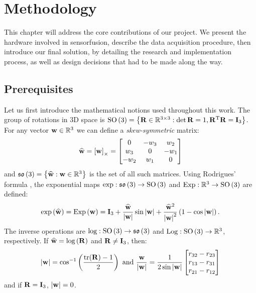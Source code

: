\chapter{Methodology}
\label{ch:methodology}

This chapter will address the core contributions of our project.
We present the hardware involved in \gls{sensorfusion}, describe the data acquisition procedure, then introduce our final solution, by detailing the research and implementation process, as well as design decisions that had to be made along the way.

\section{Prerequisites}

\newcommand{\wvec}{\vecx{w}}
\newcommand{\what}{\widehat{\vecx{w}}}
\newcommand{\wmod}{\left|\vecx{w}\right|}
\newcommand{\xihat}{\widehat{\xi}}

Let us first introduce the mathematical notions used throughout this work. The group of rotations in 3D space is $\operatorname{SO}\left(3\right) = \left\{\mathbf{R} \in {\mathbb{R}}^{3\times3} : \det{\mathbf{R}} = 1, {\mathbf{R}}^\text{T}\mathbf{R} = \mathbf{I}_3 \right\}$. For any vector $\wvec \in \RR^3$ we can define a \emph{skew-symmetric} matrix:
\begin{equation}
	\what  = \skewsym{\wvec} =
	\begin{bmatrix}
		0    & -w_3 & w_2  \\
		w_3  & 0    & -w_1 \\
		-w_2 & w_1  & 0
	\end{bmatrix}
\end{equation}
and $\so{3} = \left\{\what : \vecx{w} \in \RR^3 \right\}$ is the set of all such matrices. Using Rodrigues' formula \cite{murray2017mathematical}, the exponential maps $\text{exp}: \mathfrak{so}\left(3\right) \rightarrow \operatorname{SO}\left(3\right)$ and $\text{Exp} :{\mathbb{R}}^3 \rightarrow \operatorname{SO}\left(3\right)$ are defined:
\begin{equation}
	\expmap{\what} =\Expmap{\wvec}= \matx{I}_3 + \frac{\what}{\wmod} \sin{\wmod} + \frac{\what^2}{\wmod^2}\left(1 - \cos{\wmod}\right)\text{.}
\end{equation}
The inverse operations are $\text{log}:  \operatorname{SO}\left(3\right) \rightarrow \mathfrak{so}\left(3\right)$ and $\text{Log} :\operatorname{SO}\left(3\right) \rightarrow {\mathbb{R}}^3$, respectively. If $\what = \logmap{\matx{R}}$ and $\mathbf{R} \neq \mathbf{I}_3$, then:
\begin{equation}
	\wmod = \cos^{-1}\left(\frac{\text{tr}(\matx{R}) - 1}{2}\right)
	\text{ and }
	\frac{\wvec}{\wmod} = \frac{1}{2\sin{\wmod}}\begin{bmatrix}
		r_{32} - r_{23} \\ r_{13} - r_{31} \\ r_{21}-r_{12}
	\end{bmatrix}
\end{equation}
and if $\mathbf{R} = \mathbf{I}_3$, $\wmod=0$.

